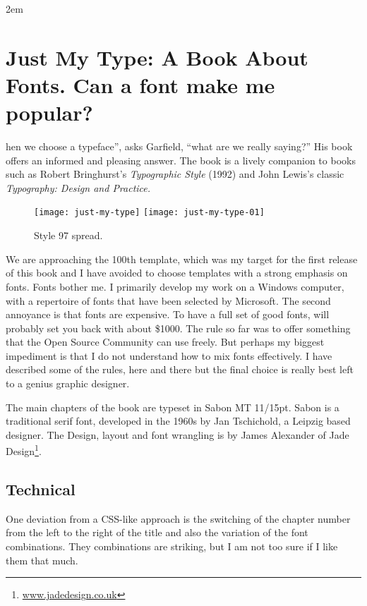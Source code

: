   

\parindent2em

\chapter[Template 97]{Just My Type: A Book About Fonts. Can a font make me popular?}
\label{style97}
\thispagestyle{plain}
\pagestyle{headings}


 hen we choose a typeface”, asks Garfield, “what are we really saying?”  His book offers an
informed and pleasing answer. The book is a lively companion to books such as Robert Bringhurst’s \textit{Typographic Style} (1992) and John Lewis’s classic \textit{Typography: Design and Practice.}

\begin{figure}[ht]
\centering
\texttt{[image: just-my-type]}
\texttt{[image: just-my-type-01]}
\caption{Style 97 spread.}
\end{figure}

We are approaching the 100th template, which was my target for the first release of this book and I have avoided to choose templates with a strong emphasis on fonts. Fonts bother me. I primarily develop my work on a Windows computer, with a repertoire of fonts that have been selected by Microsoft. The second annoyance is that fonts
are expensive. To have a full set of good fonts, will probably set you back with about \$1000. The rule so far was to
offer something that the Open Source Community can use freely. But perhaps my biggest impediment is that I do
not understand how to mix fonts effectively. I have described some of the rules, here and there but the final choice is really best left to a genius graphic designer.

The main chapters of the book are typeset in Sabon MT 11/15pt. Sabon is a traditional serif font, developed in the 1960s by Jan Tschichold, a Leipzig based designer. The Design, layout and font wrangling is by James Alexander of Jade Design\footnote{\protect\url{www.jadedesign.co.uk}}. 
 
\section{Technical}
 
One deviation from a CSS-like approach is the switching of the chapter number from the left to the right of the title
and also the variation of the font combinations. They combinations are striking, but I am not too sure if I like them that much.


